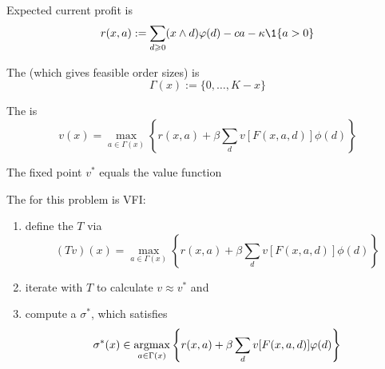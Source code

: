 \begin{frame}
    
    Expected current profit is
    \begin{equation*}
        r(x, a)  := \sum_{d \geq 0} (x \wedge d) \phi(d) 
            - c a - \kappa \1\{a > 0\}
    \end{equation*}

    \vspace{0.5em}
    \vspace{0.5em}
    The  (which gives feasible order sizes) is
    \begin{equation*}
        \Gamma(x) := \{0, \ldots, K - x\}
    \end{equation*}

    \vspace{0.5em}
    The  is
    \begin{equation*}
        v(x)
        = \max_{a \in \Gamma(x)} 
        \left\{
            r(x, a)
            + \beta
            \sum_d v[F(x, a, d)] \phi(d)
        \right\}
    \end{equation*}

    The fixed point $v^*$ equals the value function

\end{frame}

\begin{frame}
    
    The  for this problem is VFI:

    \begin{enumerate}
        \item define the  $T$ via
            \begin{equation*}
                (Tv)(x)
                = \max_{a \in \Gamma(x)} 
                \left\{
                    r(x, a)
                    + \beta
                    \sum_d v[F(x,a,d)] \phi(d)
                \right\}
            \end{equation*}
            \vspace{0.5em}
        \item iterate with $T$ to calculate $v \approx v^*$ and
            \vspace{0.5em}
            \vspace{0.5em}
        \item compute a  $\sigma^*$, which satisfies
            \begin{equation*}
                \sigma^*(x)
                \in \argmax_{a \in \Gamma(x)} 
                \left\{
                    r(x, a)
                    + \beta
                    \sum_d  v[F(x,a,d)] \phi(d)
                \right\}
            \end{equation*}
    \end{enumerate}

\end{frame}


